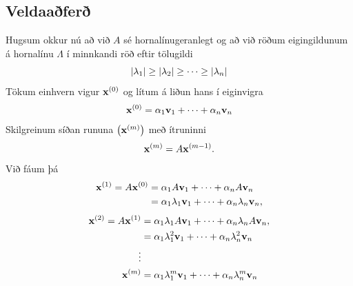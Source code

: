\documentclass[letterpaper,10pt,icelandic]{sphinxmanual}
\begin{document}
\subsection{Veldaaðferð}
\label{kafli09:id1}
Hugsum okkur nú að við \(A\) sé hornalínugeranlegt og að við röðum
eigingildunum á hornalínu \(\Lambda\) í minnkandi röð eftir
tölugildi
\begin{gather}
\begin{split}|\lambda_1|\geq |\lambda_2|\geq \cdots\geq |\lambda_n|\end{split}\notag
\end{gather}
Tökum einhvern vigur \({\mbox{${\bf x}$}}^{(0)}\) og lítum á liðun
hans í eiginvigra
\begin{gather}
\begin{split}{\mbox{${\bf x}$}}^{(0)}=\alpha_1{\mbox{${\bf v}$}}_1+\cdots+\alpha_n{\mbox{${\bf v}$}}_n\end{split}\notag
\end{gather}
Skilgreinum síðan rununa \(\big({\mbox{${\bf x}$}}^{(m)}\big)\) með
ítruninni
\begin{gather}
\begin{split}{\mbox{${\bf x}$}}^{(m)}=A{\mbox{${\bf x}$}}^{(m-1)}.\end{split}\notag
\end{gather}
Við fáum þá
\begin{gather}
\begin{split}\begin{aligned}
{\mbox{${\bf x}$}}^{(1)} =A{\mbox{${\bf x}$}}^{(0)}&=\alpha_1A{\mbox{${\bf v}$}}_1+\cdots+\alpha_nA{\mbox{${\bf v}$}}_n\\
&=\alpha_1\lambda_1{\mbox{${\bf v}$}}_1+\cdots+\alpha_n\lambda_n{\mbox{${\bf v}$}}_n,\end{aligned}\end{split}\notag
\end{gather}\begin{gather}
\begin{split}\begin{aligned}
{\mbox{${\bf x}$}}^{(2)}=A{\mbox{${\bf x}$}}^{(1)}&=\alpha_1\lambda_1A{\mbox{${\bf v}$}}_1+\cdots+\alpha_n\lambda_nA{\mbox{${\bf v}$}}_n,\\
&=\alpha_1\lambda_1^2{\mbox{${\bf v}$}}_1+\cdots+\alpha_n\lambda_n^2{\mbox{${\bf v}$}}_n\\
\vdots & \\
{\mbox{${\bf x}$}}^{(m)}&=\alpha_1\lambda_1^m{\mbox{${\bf v}$}}_1+\cdots+\alpha_n\lambda_n^m{\mbox{${\bf v}$}}_n\end{aligned}\end{split}\notag
\end{gather}
\end{document}
